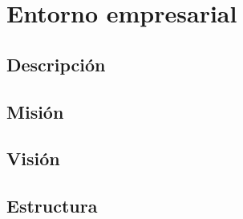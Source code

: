 \chapter{\textbf{Entorno empresarial}}

\thispagestyle{empty}

\section{Descripción}
\section{Misión}
\section{Visión}
\section{Estructura}










